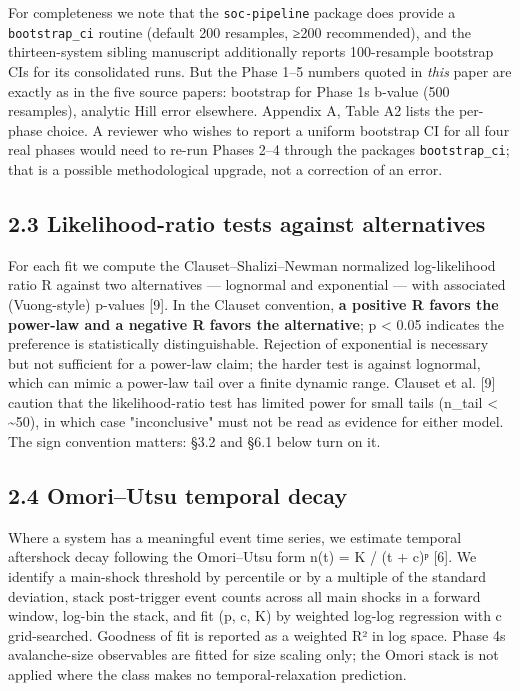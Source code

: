 \documentclass[
  11pt]{article}
\begin{document}
For completeness we note that the \texttt{soc-pipeline} package does
provide a \texttt{bootstrap\_ci} routine (default 200 resamples, ≥200
recommended), and the thirteen-system sibling manuscript additionally
reports 100-resample bootstrap CIs for its consolidated runs. But the
Phase 1--5 numbers quoted in \emph{this} paper are exactly as in the
five source papers: bootstrap for Phase 1\textquotesingle s b-value (500
resamples), analytic Hill error elsewhere. Appendix A, Table A2 lists
the per-phase choice. A reviewer who wishes to report a uniform
bootstrap CI for all four real phases would need to re-run Phases 2--4
through the package\textquotesingle s \texttt{bootstrap\_ci}; that is a
possible methodological upgrade, not a correction of an error.

\subsection{2.3 Likelihood-ratio tests against
alternatives}\label{23-likelihood-ratio-tests-against-alternatives}

For each fit we compute the Clauset--Shalizi--Newman normalized
log-likelihood ratio R against two alternatives --- lognormal and
exponential --- with associated (Vuong-style) p-values {[}9{]}. In the
Clauset convention, \textbf{a positive R favors the power-law and a
negative R favors the alternative}; p \textless{} 0.05 indicates the
preference is statistically distinguishable. Rejection of exponential is
necessary but not sufficient for a power-law claim; the harder test is
against lognormal, which can mimic a power-law tail over a finite
dynamic range. Clauset et al. {[}9{]} caution that the likelihood-ratio
test has limited power for small tails (n\_tail \textless{}
\textasciitilde50), in which case "inconclusive" must not be read as
evidence for either model. The sign convention matters: §3.2 and §6.1
below turn on it.

\subsection{2.4 Omori--Utsu temporal
decay}\label{24-omoriutsu-temporal-decay}

Where a system has a meaningful event time series, we estimate temporal
aftershock decay following the Omori--Utsu form n(t) = K / (t + c)ᵖ
{[}6{]}. We identify a main-shock threshold by percentile or by a
multiple of the standard deviation, stack post-trigger event counts
across all main shocks in a forward window, log-bin the stack, and fit
(p, c, K) by weighted log-log regression with c grid-searched. Goodness
of fit is reported as a weighted R² in log space. Phase
4\textquotesingle s avalanche-size observables are fitted for size
scaling only; the Omori stack is not applied where the class makes no
temporal-relaxation prediction.
\end{document}
